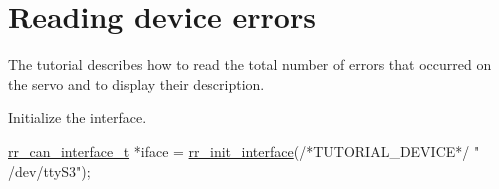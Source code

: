 \hypertarget{group__tutor__c__error__read}{}\section{Reading device errors}
\label{group__tutor__c__error__read}
The tutorial describes how to read the total number of errors that occurred on the servo and to display their description.


\begin{DoxyEnumerate}
\item Initialize the interface.
\end{DoxyEnumerate}


\begin{DoxyCodeInclude}
    \hyperlink{structrr__can__interface__t}{rr\_can\_interface\_t} *iface = \hyperlink{group___init_ga472a4890dcc7d7a13123c56a06946d91}{rr\_init\_interface}(\textcolor{comment}{/*TUTORIAL\_DEVICE*/} \textcolor{stringliteral}{"
      /dev/ttyS3"});
\end{DoxyCodeInclude}



